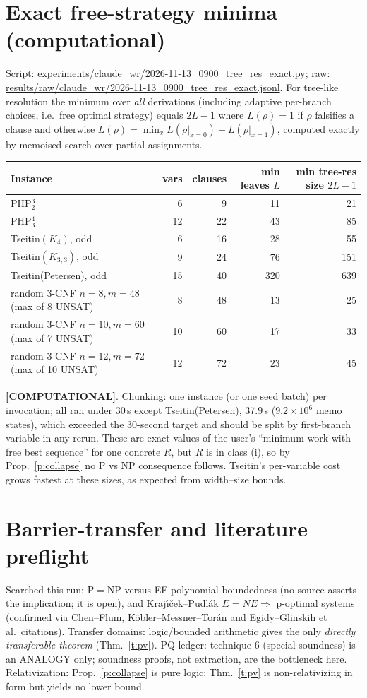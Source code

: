 \documentclass[11pt]{article}
\theoremstyle{remark}
\newcommand{\status}[1]{\textbf{[#1]}}
\begin{document}
\section{Exact free-strategy minima (computational)}
Script: \url{experiments/claude_wr/2026-11-13_0900_tree_res_exact.py}; raw:
\url{results/raw/claude_wr/2026-11-13_0900_tree_res_exact.jsonl}. For tree-like resolution the
minimum over \emph{all} derivations (including adaptive per-branch choices, i.e.\ free optimal
strategy) equals $2L-1$ where $L(\rho)=1$ if $\rho$ falsifies a clause and otherwise
$L(\rho)=\min_x L(\rho|_{x=0})+L(\rho|_{x=1})$, computed exactly by memoised search over
partial assignments.
\begin{center}\small
\begin{tabular}{lrrrr}
\toprule
Instance & vars & clauses & min leaves $L$ & min tree-res size $2L-1$\\
\midrule
PHP$^3_2$ & 6 & 9 & 11 & 21\\
PHP$^4_3$ & 12 & 22 & 43 & 85\\
Tseitin$(K_4)$, odd & 6 & 16 & 28 & 55\\
Tseitin$(K_{3,3})$, odd & 9 & 24 & 76 & 151\\
Tseitin(Petersen), odd & 15 & 40 & 320 & 639\\
random 3-CNF $n=8,m=48$ (max of 8 UNSAT) & 8 & 48 & 13 & 25\\
random 3-CNF $n=10,m=60$ (max of 7 UNSAT) & 10 & 60 & 17 & 33\\
random 3-CNF $n=12,m=72$ (max of 10 UNSAT) & 12 & 72 & 23 & 45\\
\bottomrule
\end{tabular}
\end{center}
\status{COMPUTATIONAL}. Chunking: one instance (or one seed batch) per invocation; all ran under
30\,s except Tseitin(Petersen), 37.9\,s ($9.2\times10^6$ memo states), which exceeded the
30-second target and should be split by first-branch variable in any rerun. These are exact
values of the user's ``minimum work with free best sequence'' for one concrete $R$, but $R$ is
in class (i), so by Prop.~\ref{p:collapse} no P vs NP consequence follows. Tseitin's per-variable
cost grows fastest at these sizes, as expected from width--size bounds.

\section{Barrier-transfer and literature preflight}
Searched this run: P$=$NP versus EF polynomial boundedness (no source asserts the implication;
it is open), and Kraj\'\i\v{c}ek--Pudl\'ak $E=NE\Rightarrow$ p-optimal systems
(confirmed via Chen--Flum, K\"obler--Messner--Tor\'an and Egidy--Glinskih et al.\ citations).
Transfer domains: logic/bounded arithmetic gives the only \emph{directly transferable theorem}
(Thm.~\ref{t:pv}). PQ ledger: technique 6 (special soundness) is an ANALOGY only; soundness
proofs, not extraction, are the bottleneck here. Relativization: Prop.~\ref{p:collapse} is
pure logic; Thm.~\ref{t:pv} is non-relativizing in form but yields no lower bound.
\end{document}

